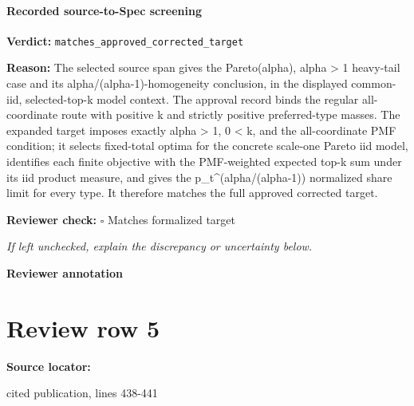 \documentclass[10pt]{article}
\newcommand{\reviewerbox}{%
  \par\noindent\fbox{\parbox{0.96\linewidth}{\rule{0pt}{0.38in}}}\par
}
\newcommand{\reviewmatch}[1]{%
  \par\noindent\textbf{Reviewer check:} $\square$\; #1\par
  \noindent\emph{If left unchecked, explain the discrepancy or uncertainty below.}\par
}
\begin{document}
\paragraph{Recorded source-to-Spec screening}
\textbf{Verdict:} \texttt{matches\_approved\_corrected\_target}
\\
{\raggedright
\textbf{Reason:} The selected source span gives the Pareto(alpha), alpha > 1 heavy-\allowbreak{}tail case and its alpha/\allowbreak{}(alpha-\allowbreak{}1)-\allowbreak{}homogeneity conclusion, in the displayed common-\allowbreak{}iid, selected-\allowbreak{}top-\allowbreak{}k model context.\allowbreak{} The approval record binds the regular all-\allowbreak{}coordinate route with positive k and strictly positive preferred-\allowbreak{}type masses.\allowbreak{} The expanded target imposes exactly alpha > 1, 0 < k, and the all-\allowbreak{}coordinate PMF condition;\allowbreak{} it selects fixed-\allowbreak{}total optima for the concrete scale-\allowbreak{}one Pareto iid model, identifies each finite objective with the PMF-\allowbreak{}weighted expected top-\allowbreak{}k sum under its iid product measure, and gives the p\_\allowbreak{}t\textasciicircum{}(alpha/\allowbreak{}(alpha-\allowbreak{}1)) normalized share limit for every type.\allowbreak{} It therefore matches the full approved corrected target.\allowbreak{}
\par}
\reviewmatch{Matches formalized target}
\noindent\textbf{Reviewer annotation}\par
\reviewerbox
\clearpage
\hypertarget{source-claim-846cffa9077c1769}{}
\section*{Review row 5}
\textbf{Source locator:} {\footnotesize\raggedright cited publication, lines 438-\allowbreak{}441\par}
\end{document}
